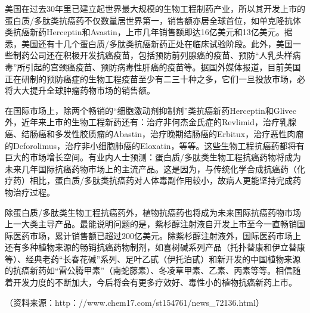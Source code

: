 美国在过去30年里已建立起世界最大规模的生物工程制药产业，所以其开发上市的蛋白质/多肽类抗癌药不仅数量居世界第一，销售额亦居全球首位，如单克隆抗体类抗癌新药Herceptin和Avastin，上市几年销售额即达16亿美元和13亿美元。据悉，美国还有十几个蛋白质/多肽类抗癌新药正处在临床试验阶段。此外，美国一些制药公司还在积极开发抗癌疫苗，包括预防前列腺癌的疫苗、预防“人乳头样病毒”所引起的宫颈癌疫苗、预防病毒性肝癌的疫苗等。据国外媒体报道，目前美国正在研制的预防癌症的生物工程疫苗至少有二三十种之多，它们一旦投放市场，必将大大提升全球肿瘤药物市场的销售额。

在国际市场上，除两个畅销的“细胞激动剂抑制剂”类抗癌新药Herceptin和Glivec外，近年来上市的生物工程新药还有：治疗非何杰金氏症的Revlimid，治疗乳腺癌、结肠癌和多发性胶质瘤的Abastin，治疗晚期结肠癌的Erbitux，治疗恶性肉瘤的Deforolimus，治疗非小细胞肺癌的Eloxatin，等等。这些生物工程抗癌药都将有巨大的市场增长空间。有业内人士预测：蛋白质/多肽类生物工程抗癌药物将成为未来几年国际抗癌药物市场上的主流产品。这是因为，与传统化学合成抗癌药（化疗药）相比，蛋白质/多肽类抗癌药对人体毒副作用较小，故病人更能坚持完成药物治疗过程。

除蛋白质/多肽类生物工程抗癌药外，植物抗癌药也将成为未来国际抗癌药物市场上一大类主导产品。最能说明问题的是，紫杉醇注射液自开发上市至今一直畅销国际医药市场，累计销售额已超过200亿美元。除紫杉醇注射液外，国际医药市场上还有多种植物来源的畅销抗癌药物制剂，如喜树碱系列产品（托扑替康和伊立替康等）、经典老药“长春花碱”系列、足叶乙甙（伊托泊甙）和新开发的中国植物来源的抗癌新药如“雷公腾甲素”（南蛇藤素）、冬凌草甲素、乙素、丙素等等。相信随着开发力度的不断加大，今后将会有更多疗效好、毒性小的植物抗癌新药上市。

（资料来源：http：//www.chem17.com/st154761/news\_72136.html）

